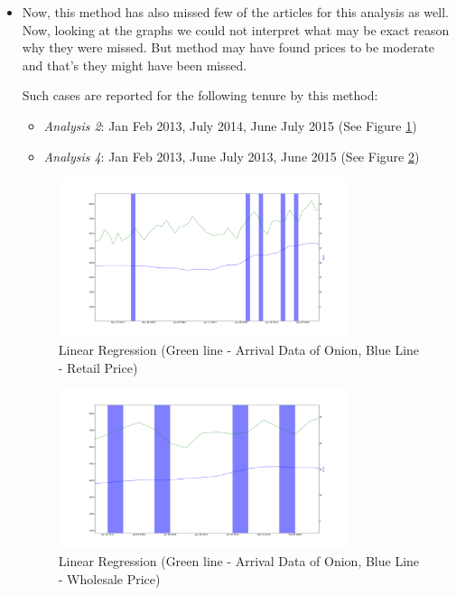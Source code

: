 \documentclass[a4paper,10pt]{report}
\begin{document}
\begin{itemize}
			
			
			\item Now, this method has also missed few of the articles for this analysis as well. Now, looking at the graphs we could not interpret what may be exact reason why they were missed. But method may have found prices to be moderate and that's they might have been missed.
			
			Such cases are reported for the following tenure by this method:
			\begin{itemize}
				\item \textit{Analysis 2}: Jan Feb 2013, July 2014, June July 2015 (See Figure \ref{fig:12222})
				\item \textit{Analysis 4}: Jan Feb 2013, June July 2013, June 2015 (See Figure \ref{fig:12242})
			\end{itemize}
			\begin{figure}[H]
		    	\centering
  		    	\includegraphics[width=0.8\textwidth]{graphs/12222.png}
		    	\caption{Linear Regression (Green line - Arrival Data of Onion, Blue Line - Retail Price)}
		    	\label{fig:12222}
			\end{figure}
			
			\begin{figure}[H]
		    	\centering
  		    	\includegraphics[width=0.8\textwidth]{graphs/12242.png}
		    	\caption{Linear Regression (Green line - Arrival Data of Onion, Blue Line - Wholesale Price)}
		    	\label{fig:12242}
			\end{figure}
		\end{itemize}
		
\end{document}
